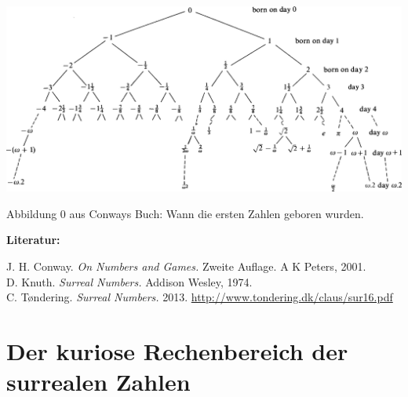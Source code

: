 \documentclass{zirkelblatt}
\newcommand{\head}[1]{\section*{\rmfamily #1}}%
\begin{document}
\begin{landscape}
\thispagestyle{empty}
\begin{center}
\includegraphics[scale=0.6]{stammbaum-der-surrealen-zahlen}

Abbildung 0 aus Conways Buch: Wann die ersten Zahlen geboren wurden.
\end{center}

\vfill
\textbf{Literatur:}

J. H. Conway. \emph{On Numbers and Games.} Zweite Auflage. A K Peters, 2001. \\
D. Knuth. \emph{Surreal Numbers.} Addison Wesley, 1974. \\
C. Tøndering. \emph{Surreal Numbers.} 2013.
\url{http://www.tondering.dk/claus/sur16.pdf}
\end{landscape}

\addtocounter{aufgabennummer}{-1}

\head{Der kuriose Rechenbereich der surrealen Zahlen}
\end{document}
